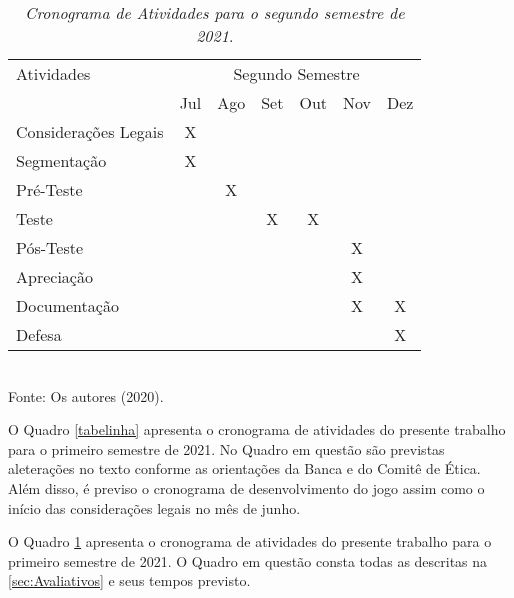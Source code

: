 \captionsetup[table]{name=Quadro}
\begin{table}[!htb]
    \centering
    \renewcommand{\arraystretch}{1.5} %
    \caption{\emph{Cronograma de Atividades para o segundo semestre de 2021}.}\label{tabelinha2}
    \vspace{0.2cm}
    \begin{tabular}{|p{8cm}|c|c|c|c|c|c|}
    \hline
    Atividades & \multicolumn{6}{|c|}{Segundo Semestre} \\
    \cline{2-7}                                                                             & Jul   & Ago   & Set   & Out   & Nov   & Dez   \\
    \hline Considerações Legais                                                             & X     &       &       &       &       &       \\
    \hline Segmentação                                                                      & X     &       &       &       &       &       \\
    \hline Pré-Teste                                                                        &       & X     &       &       &       &       \\
    \hline Teste                                                                            &       &       & X     & X     &       &       \\
    \hline Pós-Teste                                                                        &       &       &       &       & X     &       \\
    \hline Apreciação                                                                       &       &       &       &       & X     &       \\
    \hline Documentação                                                                     &       &       &       &       & X     & X     \\
    \hline Defesa                                                                           &       &       &       &       &       & X     \\
    \hline
    \end{tabular} 
    \\
    Fonte: Os autores (2020).
\end{table}


O Quadro \ref{tabelinha} apresenta o cronograma de atividades do presente trabalho para o primeiro semestre de 2021. No Quadro em questão são previstas aleterações no texto conforme as orientações da Banca e do Comitê de Ética. Além disso, é previso o cronograma de desenvolvimento do jogo assim como o início das considerações legais no mês de junho. 

O Quadro \ref{tabelinha2} apresenta o cronograma de atividades do presente trabalho para o primeiro semestre de 2021. O Quadro em questão consta todas as descritas na \autoref{sec:Avaliativos} e seus tempos previsto. 
